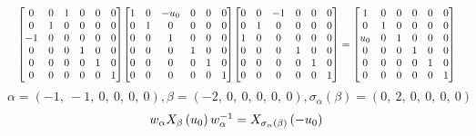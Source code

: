 \documentclass[11pt]{article}
\theoremstyle{definition}
\begin{document}
\[
\scaletoalign{\textwidth}{{\left[\begin{matrix}0 & 0 & 1 & 0 & 0 & 0\\0 & 1 & 0 & 0 & 0 & 0\\-1 & 0 & 0 & 0 & 0 & 0\\0 & 0 & 0 & 1 & 0 & 0\\0 & 0 & 0 & 0 & 1 & 0\\0 & 0 & 0 & 0 & 0 & 1\end{matrix}\right]} {\left[\begin{matrix}1 & 0 & - u_{0} & 0 & 0 & 0\\0 & 1 & 0 & 0 & 0 & 0\\0 & 0 & 1 & 0 & 0 & 0\\0 & 0 & 0 & 1 & 0 & 0\\0 & 0 & 0 & 0 & 1 & 0\\0 & 0 & 0 & 0 & 0 & 1\end{matrix}\right]} {\left[\begin{matrix}0 & 0 & -1 & 0 & 0 & 0\\0 & 1 & 0 & 0 & 0 & 0\\1 & 0 & 0 & 0 & 0 & 0\\0 & 0 & 0 & 1 & 0 & 0\\0 & 0 & 0 & 0 & 1 & 0\\0 & 0 & 0 & 0 & 0 & 1\end{matrix}\right]} = {\left[\begin{matrix}1 & 0 & 0 & 0 & 0 & 0\\0 & 1 & 0 & 0 & 0 & 0\\u_{0} & 0 & 1 & 0 & 0 & 0\\0 & 0 & 0 & 1 & 0 & 0\\0 & 0 & 0 & 0 & 1 & 0\\0 & 0 & 0 & 0 & 0 & 1\end{matrix}\right]}}
\]
\[
\alpha = \left( -1, \  -1, \  0, \  0, \  0, \  0\right), \beta = \left( -2, \  0, \  0, \  0, \  0, \  0\right), \sigma_{\alpha}(\beta) = \left( 0, \  2, \  0, \  0, \  0, \  0\right)
\]
\[
\scaletoalign{\textwidth}{w_{\alpha} X_{\beta}\left(u_{0}\right) w_{\alpha}^{-1} = X_{\sigma_{\alpha}\left(\beta\right)}\left(- u_{0}\right)}
\]
\end{document}
